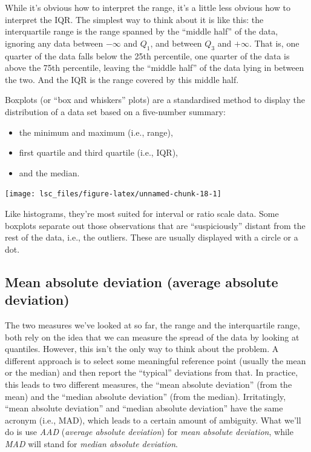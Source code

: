 \documentclass[
  11pt,
]{book}
\providecommand{\tightlist}{%
  \setlength{\itemsep}{0pt}\setlength{\parskip}{0pt}}
\theoremstyle{definition}
\theoremstyle{definition}
\theoremstyle{definition}
\theoremstyle{definition}
\theoremstyle{remark}
\begin{document}
While it's obvious how to interpret the range, it's a little less obvious how to interpret the IQR. The simplest way to think about it is like this: the interquartile range is the range spanned by the ``middle half'' of the data, ignoring any data between \(-\infty\) and \(Q_1\), and between \(Q_3\) and \(+\infty\). That is, one quarter of the data falls below the 25th percentile, one quarter of the data is above the 75th percentile, leaving the ``middle half'' of the data lying in between the two. And the IQR is the range covered by this middle half.

\hypertarget{boxplot}{}
\begin{callout}[Boxplots]

Boxplots (or ``box and whiskers'' plots) are a standardised method to display the distribution of a data set based on a five-number summary:

\begin{itemize}
\tightlist
\item
  the minimum and maximum (i.e., range),
\item
  first quartile and third quartile (i.e., IQR),
\item
  and the median.
\end{itemize}

\begin{center}\texttt{[image: lsc\_files/figure-latex/unnamed-chunk-18-1]} \end{center}

Like histograms, they're most suited for interval or ratio scale data. Some boxplots separate out those observations that are ``suspiciously'' distant from the rest of the data, i.e., the outliers. These are usually displayed with a circle or a dot.

\end{callout}

\hypertarget{aad}{%
\subsection{Mean absolute deviation (average absolute deviation)}\label{aad}}

The two measures we've looked at so far, the range and the interquartile range, both rely on the idea that we can measure the spread of the data by looking at quantiles. However, this isn't the only way to think about the problem. A different approach is to select some meaningful reference point (usually the mean or the median) and then report the ``typical'' deviations from that. In practice, this leads to two different measures, the ``mean absolute deviation'' (from the mean) and the ``median absolute deviation'' (from the median). Irritatingly, ``mean absolute deviation'' and ``median absolute deviation'' have the same acronym (i.e., MAD), which leads to a certain amount of ambiguity. What we'll do is use \emph{AAD} (\emph{average absolute deviation}) for \emph{mean absolute deviation}, while \emph{MAD} will stand for \emph{median absolute deviation}.
\end{document}
